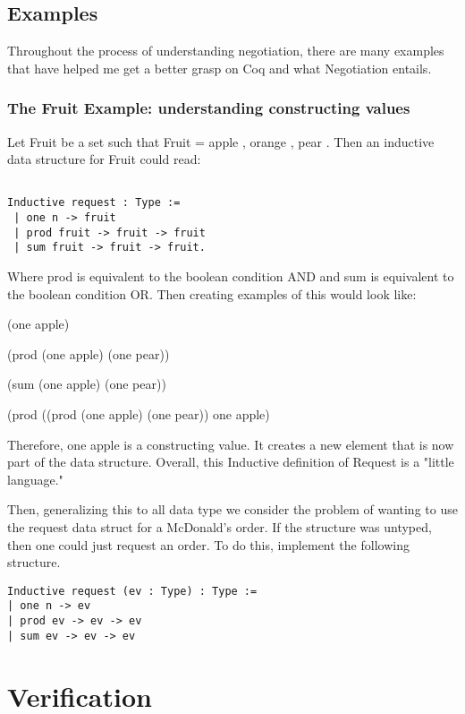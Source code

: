 \documentclass[10pt]{report}
\begin{document}
\section {Examples}

Throughout the process of understanding negotiation, there are many examples that have helped me get a better grasp on Coq and what Negotiation entails. 

\subsection {The Fruit Example: understanding constructing values}

Let Fruit be a set such that Fruit = { apple , orange , pear }. Then an inductive data structure for Fruit could read:  

\begin{verbatim}

Inductive request : Type := 
 | one n -> fruit
 | prod fruit -> fruit -> fruit
 | sum fruit -> fruit -> fruit.
\end{verbatim}

Where prod is equivalent to the boolean condition AND and sum is equivalent to the boolean condition OR. Then creating examples of this would look like: 


(one apple)

(prod (one apple) (one pear))

(sum (one apple) (one pear))

(prod ((prod (one apple) (one pear)) one apple)


Therefore, one apple is a constructing value. It creates a new element that is now part of the data structure. Overall, this Inductive definition of Request is a "little language."

Then, generalizing this to all data type we consider the problem of wanting to use the request data struct for a McDonald's order. If the structure was untyped, then one could just request an order. To do this, implement the following structure. 

\begin{verbatim}
Inductive request (ev : Type) : Type :=
| one n -> ev
| prod ev -> ev -> ev
| sum ev -> ev -> ev

\end{verbatim}


\chapter {Verification}
\end{document}
